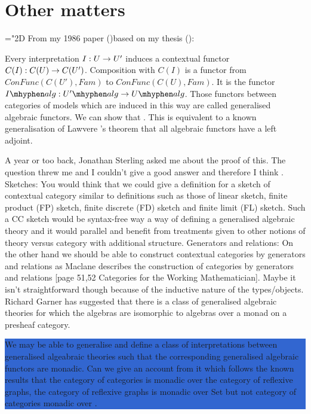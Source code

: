 \documentclass[10pt,a4paper]{article}
\theoremstyle{remark}
\newcommand{\highlightpara}[1]{\colorbox{highlight}{%
    \parbox{\dimexpr\linewidth-2\fboxsep}%
        {#1}}
}
\begin{document}
\section{Other matters}
\mathchardef\mhyphen="2D %
\newcommand{\Ualg}{U \mhyphen alg}
\newcommand{\Upalg}{U' \mhyphen alg}
\newcommand{\Ialg}{I \mhyphen alg}
\note From my 1986 paper (\cite{Cartmell86})based on my thesis (\cite{Cartmell78}):
\begin{tightquote}
Every interpretation $I:U \rightarrow U'$ induces a contextual functor 
$C(I):C(U) \rightarrow C(U')$. Composition with $C(I)$ is a functor from 
$ConFunc(C(U'),Fam)$ to
$ConFunc(C(U),Fam)$. It is the functor $\Ialg:\Upalg \morph \Ualg$. Those functors
between categories of models which are induced in this way are called generalised
algebraic functors. We can show that .
This is
equivalent to a known generalisation of Lawvere \cite{LawvereAlgebraicTheories}'s theorem that all algebraic
functors have a left adjoint. 
\end{tightquote}
A year or too back, Jonathan Sterling asked me about the proof of this. The question threw me and I couldn't give a good answer and therefore I think .
\note
Sketches: You would think that we could give a definition for a sketch of contextual category 
similar to  definitions such as those of linear sketch, finite product (FP) sketch, finite discrete (FD) sketch and finite limit (FL) sketch. Such a CC sketch would be syntax-free way a way of defining a generalised algebraic theory and it would parallel and benefit from treatments given to other notions of theory versus category with additional structure. 
\note
Generators and relations: On the other hand we should be able to construct contextual categories by generators and  
relations as Maclane describes the construction of categories by generators and relations
[page 51,52 Categories for the Working Mathematician]. Maybe it isn't  straightforward  though because of the inductive nature of the types/objects. 
\note Richard Garner has suggested that there is a class of generalised algebraic theories for which the algebras are isomorphic to algebras  over a monad on a presheaf category.

\highlightpara{We may be able to generalise and define a class of interpretations between 
generalised algeabraic theories such that the corresponding generalised algebraic functors are monadic.
Can we give an account from it which  follows the known results that the category of categories is monadic over the category of reflexive graphs, the category of reflexive graphs is monadic over Set but
not category of categories monadic over \catc[Set]. }	
\end{document}
